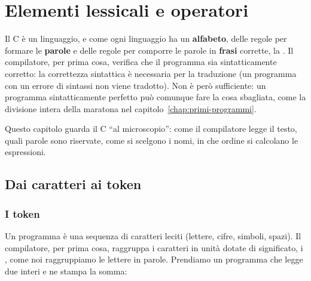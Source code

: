 \chapter{Elementi lessicali e operatori}
\label{chap:sintassi}

\newcommand{\tk}[2]{\tikz[baseline=(t.base)]\node[#1] (t) {\strut #2};}

Il C è un linguaggio, e come ogni linguaggio ha un \textbf{alfabeto}, delle
regole per formare le \textbf{parole} e delle regole per comporre le parole
in \textbf{frasi} corrette, la . Il compilatore, per prima
cosa, verifica che il programma sia sintatticamente corretto: la
correttezza sintattica è necessaria per la traduzione (un programma con un
errore di sintassi non viene tradotto). Non è però sufficiente: un programma
sintatticamente perfetto può comunque fare la cosa sbagliata, come la
divisione intera della maratona nel capitolo~\ref{chap:primi-programmi}.

Questo capitolo guarda il C “al microscopio”: come il compilatore legge
il testo, quali parole sono riservate, come si scelgono i nomi, in che
ordine si calcolano le espressioni.

\section{Dai caratteri ai token}

\subsection{I token}

Un programma è una sequenza di caratteri leciti (lettere, cifre, simboli,
spazi). Il compilatore, per prima cosa, raggruppa i caratteri in unità
dotate di significato, i , come noi raggruppiamo le lettere in
parole. Prendiamo un programma che legge due interi e ne stampa la somma:

